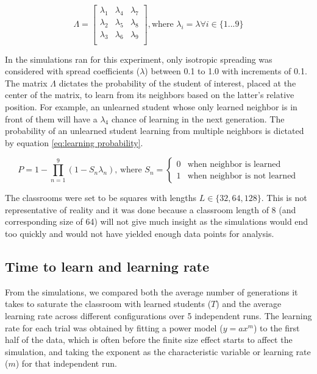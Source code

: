 \documentclass[10pt,a4paper,twoside]{article}
\begin{document}
\begin{equation}\label{eq:Lambda matrix}
  \Lambda = 
  \begin{bmatrix}
  \lambda_1 & \lambda_4 & \lambda_7\\
  \lambda_2 & \lambda_5 & \lambda_8\\
  \lambda_3 & \lambda_6 & \lambda_9\\
  \end{bmatrix}, \text{where } \lambda_i=\lambda \forall i \in \lbrace1...9\rbrace
\end{equation}

\noindent In the simulations ran for this experiment, only isotropic spreading was considered with spread coefficients ($\lambda$) between 0.1 to 1.0 with increments of 0.1. The matrix $\Lambda$ dictates the probability of the student of interest, placed at the center of the matrix, to learn from its neighbors based on the latter's relative position. For example, an unlearned student whose only learned neighbor is in front of them will have a $\lambda_4$ chance of learning in the next generation. The probability of an unlearned student learning from multiple neighbors is dictated by equation \ref{eq:learning probability}.

\begin{equation}
  P = 1 - \prod_{n=1}^{9}{(1-S_n\lambda_n)}
  \text{, where } S_n=
  \begin{cases}
    0 & \text{when neighbor is learned}\\
    1 & \text{when neighbor is not learned}
  \end{cases}
  \label{eq:learning probability}
\end{equation}

\noindent The classrooms were set to be squares with lengths $L \in \lbrace 32,64,128\rbrace$. This is not representative of reality and it was done because a classroom length of 8 (and corresponding size of 64) will not give much insight as the simulations would end too quickly and would not have yielded enough data points for analysis.

\subsection{Time to learn and learning rate}
From the simulations, we compared both the average number of generations it takes to saturate the classroom with learned students ($T$) and the average learning rate across different configurations over 5 independent runs. The learning rate for each trial was obtained by fitting a power model ($y = ax^m$) to the first half of the data, which is often before the finite size effect starts to affect the simulation, and taking the exponent as the characteristic variable or learning rate ($m$) for that independent run.
\end{document}
